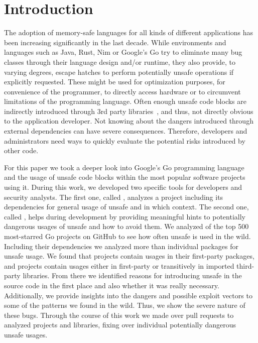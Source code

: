 \section{Introduction}
\label{sec:intro}


The adoption of memory-safe languages for all kinds of different applications has been increasing significantly in the last decade. 
While environments and languages such as Java, Rust, Nim or Google's Go try to eliminate many bug classes through their language design and/or runtime, they also provide, to varying degrees, escape hatches to perform potentially unsafe operations if explicitly requested.
These might be used for optimization purposes, for convenience of the programmer, to directly access hardware or to circumvent limitations of the programming language.
Often enough unsafe code blocks are indirectly introduced through 3rd party libraries~\cite{evans2020}, and thus, not directly obvious to the application developer.
Not knowing about the dangers introduced through external dependencies can have severe consequences.
Therefore, developers and administrators need ways to quickly evaluate the potential risks introduced by other code.

For this paper we took a deeper look into Google's Go programming language and the usage of unsafe code blocks within the most popular software projects using it. 
During this work, we developed two specific tools for developers and security analysts.
The first one, called \toolUsage{}, analyzes a project including its dependencies for general usage of unsafe and in which context.
The second one, called \toolSA{}, helps during development by providing meaningful hints to potentially dangerous usages of unsafe and how to avoid them. 
We analyzed \projsAnalyzed{} of the top 500 most-starred Go projects on GitHub to see how often unsafe is used in the wild. 
Including their dependencies we analyzed more than  individual packages for unsafe usage.
We found that \percentageProjectsWithUnsafe{} projects contain \unsafe{} usages in their first-party packages, and \percentageProjectsAndDependenciesUnsafe{}
projects contain \unsafe{} usages either in first-party or transitively in imported third-party libraries.
From there we identified reasons for introducing unsafe in the source code in the first place and also whether it was really necessary.
Additionally, we provide insights into the dangers and possible exploit vectors to some of the patterns we found in the wild. 
Thus, we show the severe nature of these bugs.
Through the course of this work we made over \numberPRs{} pull requests to analyzed projects and libraries, fixing over \numberBugsFixed{} individual potentially dangerous unsafe usages.

